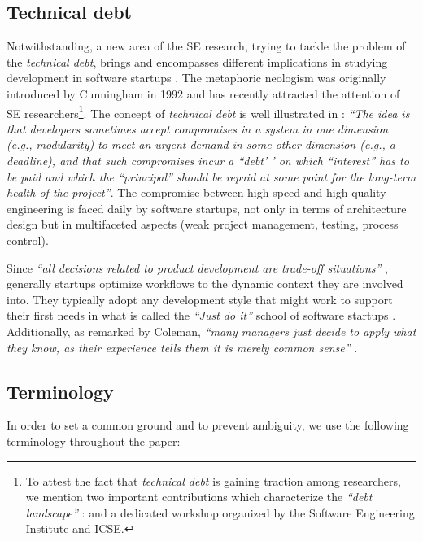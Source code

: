 \documentclass[10pt,journal,letterpaper,compsoc]{IEEEtran}
\begin{document}
\subsection{Technical debt}
Notwithstanding, a new area of the SE research, trying to tackle the problem of the \textit{technical debt},  brings and encompasses different implications in studying development in software startups \cite{Tom2013}. The metaphoric neologism was originally introduced by Cunningham in 1992 \cite{TechnicalDebtCunn} and has recently attracted the attention of SE researchers\footnote{To attest the fact that \textit{technical debt} is gaining traction among researchers, we mention two important contributions which characterize the \textit{``debt landscape''} : \cite{Nugroho2011,Izurieta2012} and a dedicated workshop \cite{workshopDebt} organized by the Software Engineering Institute  and ICSE.}. The concept of \textit{technical debt} is well illustrated in \cite{Brown:2010:MTD:1882362.1882373} : \textit{``The idea is that developers sometimes accept compromises in a system in one dimension (e.g., modularity) to meet an urgent demand in some other dimension (e.g., a deadline), and that such compromises incur a 
``debt'
' on which ``interest'' has to be paid and which the ``principal'' should be repaid at some point for the long-term health of the project''}.  The compromise between high-speed and high-quality engineering is faced daily by software startups, not only in terms of architecture design but in multifaceted aspects (weak project management, testing, process control).

Since \textit{``all decisions related to product development are trade-off situations''} \cite{Hilmola2003}, generally startups optimize workflows to the dynamic context they are involved into. They typically adopt any development style that might work to support their first needs in what is called the \textit{``Just do it''} school of software startups \cite{Ries2011}. Additionally, as remarked by Coleman, \textit{``many managers just decide to apply what they know, as their experience tells them it is merely common sense''} \cite{Coleman2008}.

\subsection{Terminology}
In order to set a common ground and to prevent ambiguity, we use the following terminology throughout the paper:
\end{document}

